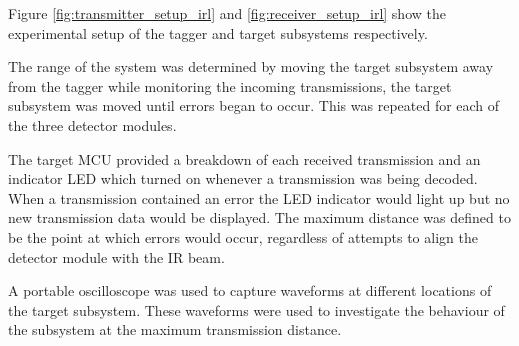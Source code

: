 Figure \ref{fig:transmitter_setup_irl} and \ref{fig:receiver_setup_irl} show the experimental setup of the tagger and target subsystems respectively.

The range of the system was determined by moving the target subsystem away from the tagger while monitoring the incoming transmissions, the target subsystem was moved until errors began to occur. This was repeated for each of the three detector modules.

The target MCU provided a breakdown of each received transmission and an indicator LED which turned on whenever a transmission was being decoded. When a transmission contained an error the LED indicator would light up but no new transmission data would be displayed. The maximum distance was defined to be the point at which errors would occur, regardless of attempts to align the detector module with the IR beam.

A portable oscilloscope was used to capture waveforms at different locations of the target subsystem. These waveforms were used to investigate the behaviour of the subsystem at the maximum transmission distance.


